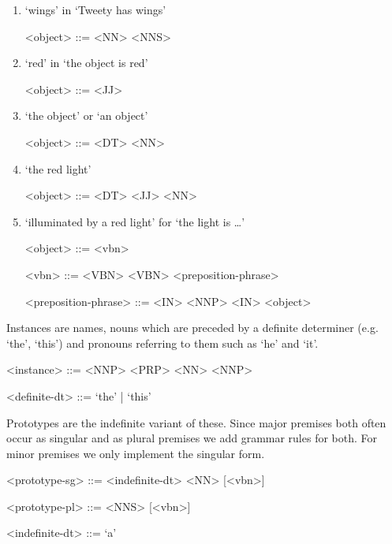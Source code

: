 \begin{enumerate}
    \item `wings' in `Tweety has wings'
    \begin{grammar}
        <object> ::= <NN> \alt <NNS>
    \end{grammar}

    \item `red' in `the object is red'
    \begin{grammar}
        <object> ::= <JJ>
    \end{grammar}

    \item `the object' or `an object'
    \begin{grammar}
        <object> ::= <DT> <NN>
    \end{grammar}

    \item `the red light'
    \begin{grammar}
        <object> ::= <DT> <JJ> <NN>
    \end{grammar}

    \item `illuminated by a red light' for `the light is …'
    \begin{grammar}
        <object> ::= <vbn>

        <vbn> ::= <VBN>
        \alt <VBN> <preposition-phrase>

        <preposition-phrase> ::= <IN> <NNP>
        \alt <IN> <object>
    \end{grammar}
\end{enumerate}

Instances are names, nouns which are preceded by a definite determiner (e.g. `the', `this') and pronouns referring to them such as `he' and `it'.

\begin{grammar}
<instance> ::= <NNP>
\alt <PRP>
 <NN>
 <NNP>

<definite-dt> ::= `the' | `this'
\end{grammar}

Prototypes are the indefinite variant of these. Since major premises both often occur as singular and as plural premises we add grammar rules for both. For minor premises we only implement the singular form.

\begin{grammar}
<prototype-sg> ::= <indefinite-dt> <NN> [<vbn>]

<prototype-pl> ::= <NNS> [<vbn>]

<indefinite-dt> ::= `a'
\end{grammar}

